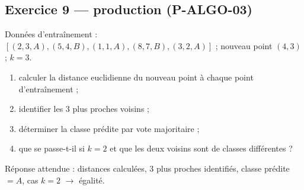 \documentclass[a4paper,11pt]{article}
\begin{document}
\subsection*{Exercice 9 — production (P-ALGO-03)}
Données d'entraînement : $[(2,3,A),(5,4,B),(1,1,A),(8,7,B),(3,2,A)]$ ; nouveau point $(4,3)$ ; $k=3$.
\begin{enumerate}[nosep,label=(9\alph*)]
  \item calculer la distance euclidienne du nouveau point à chaque point d'entraînement ;
  \item identifier les 3 plus proches voisins ;
  \item déterminer la classe prédite par vote majoritaire ;
  \item que se passe-t-il si $k=2$ et que les deux voisins sont de classes différentes ?
\end{enumerate}
Réponse attendue : distances calculées, 3 plus proches identifiés, classe prédite $=A$, cas $k=2$ $\rightarrow$ égalité.
\end{document}

